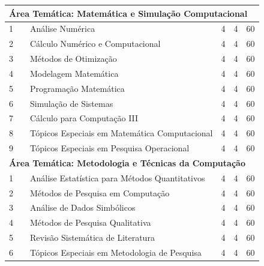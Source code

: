 \documentclass[
	12pt,				%
	openright,			%
  oneside,     %
	a4paper,			%
	english,			%
	french,				%
	spanish,			%
	brazil				%
	]{abntex2}
\begin{document}
\begin{apendicesenv}
\begin{longtable}{r|r|l|r|r|r}
\multicolumn{6}{l}{\textbf{Área Temática: Matemática e Simulação Computacional}} \\ \hline
    1     &       & Análise Numérica & 4     & 4     & 60 \\ \hline
    2     &       & Cálculo Numérico e Computacional & 4     & 4     & 60 \\ \hline
    3     &       & Métodos de Otimização & 4     & 4     & 60 \\ \hline
    4     &       & Modelagem Matemática & 4     & 4     & 60 \\ \hline
    5     &       & Programação Matemática & 4   & 4  & 60 \\ \hline
    6     &       & Simulação de Sistemas & 4     & 4     & 60 \\ \hline
    7     &       & Cálculo para Computação III & 4     & 4     & 60 \\ \hline
    8     &       & \small{Tópicos Especiais em Matemática Computacional} & 4     & 4     & 60 \\ \hline
    9     &       & \small{Tópicos Especiais em Pesquisa Operacional} & 4     & 4     & 60 \\ \hline

\multicolumn{6}{l}{\textbf{Área Temática: Metodologia e Técnicas da Computação}} \\ \hline
    1     &       & \small{Análise Estatística para Métodos Quantitativos} & 4     & 4     & 60 \\ \hline
    2     &       & Métodos de Pesquisa em Computação & 4     & 4     & 60 \\ \hline
    3     &       & Análise de Dados Simbólicos & 4     & 4     & 60 \\ \hline
    4     &       & Métodos de Pesquisa Qualitativa & 4     & 4     & 60 \\ \hline
    5     &       & Revisão Sistemática de Literatura & 4     & 4     & 60 \\ \hline
    6     &       & \small{Tópicos Especiais em Metodologia de Pesquisa} & 4     & 4     & 60 \\ \hline


\end{longtable}
\end{apendicesenv}
\end{document}
